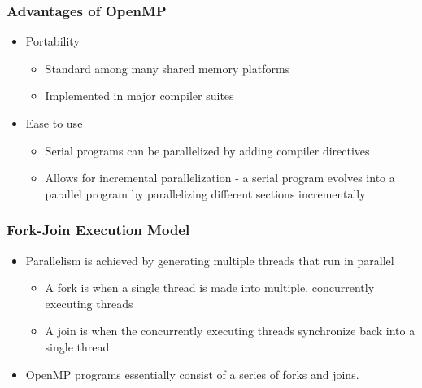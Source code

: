 \documentclass[c,mathserif,compress,xcolor=svgnames]{beamer}
\newenvironment{bblock}[0]
{
\begin{beamerboxesrounded}[upper=uppercol1,lower=lowercol1,shadow=true]}
{\end{beamerboxesrounded}}
\begin{document}
\begin{frame}
  \frametitle{\small Advantages of OpenMP}
  \begin{bblock}{}
    \begin{itemize}
      \item Portability
      \begin{itemize}
        \item Standard among many shared memory platforms
        \item Implemented in major compiler suites
      \end{itemize}
      \item Ease to use 
      \begin{itemize}
        \item Serial programs can be parallelized by adding compiler directives
        \item Allows for incremental parallelization - a serial program evolves into a parallel program by parallelizing different sections incrementally
      \end{itemize}
    \end{itemize}
  \end{bblock}
\end{frame}

\begin{frame}
  \frametitle{\small Fork-Join Execution Model}
  \begin{bblock}{}
    \begin{itemize}
      \item Parallelism is achieved by generating multiple threads that run in parallel
      \begin{itemize}
        \item A fork  is when a single thread is made into multiple, concurrently executing threads
        \item A join  is when the concurrently executing threads synchronize back into a single thread
      \end{itemize}
      \item OpenMP programs essentially consist of a series of forks and joins.
    \end{itemize}
    \vspace{-0.8cm}
    
  \end{bblock}
\end{frame}
\end{document}
